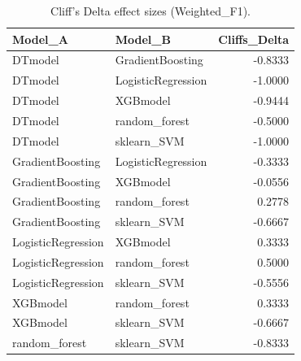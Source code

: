 \begin{table}[t]
\centering
\begin{tabular}{llr}
\toprule
Model_A & Model_B & Cliffs_Delta \\
\midrule
DTmodel & GradientBoosting & -0.8333 \\
DTmodel & LogisticRegression & -1.0000 \\
DTmodel & XGBmodel & -0.9444 \\
DTmodel & random_forest & -0.5000 \\
DTmodel & sklearn_SVM & -1.0000 \\
GradientBoosting & LogisticRegression & -0.3333 \\
GradientBoosting & XGBmodel & -0.0556 \\
GradientBoosting & random_forest & 0.2778 \\
GradientBoosting & sklearn_SVM & -0.6667 \\
LogisticRegression & XGBmodel & 0.3333 \\
LogisticRegression & random_forest & 0.5000 \\
LogisticRegression & sklearn_SVM & -0.5556 \\
XGBmodel & random_forest & 0.3333 \\
XGBmodel & sklearn_SVM & -0.6667 \\
random_forest & sklearn_SVM & -0.8333 \\
\bottomrule
\end{tabular}
\caption{Cliff's Delta effect sizes (Weighted_F1).}
\label{tab:cliffs_Weighted_F1}
\end{table}
